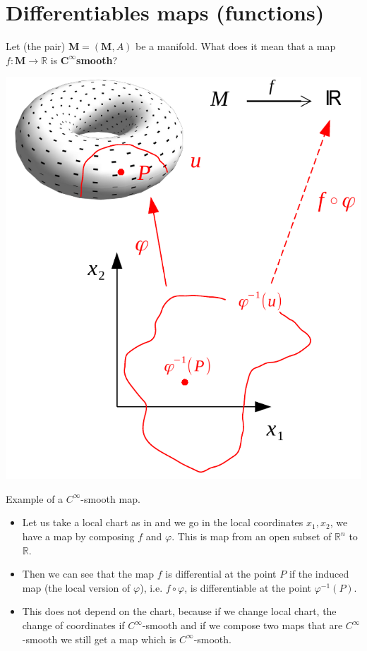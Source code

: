 \documentclass[../main.tex]{subfiles}
\begin{document}
\section[Differentiables maps]{Differentiables maps (functions)}
Let (the pair) $\mathbf{M}=\left(\mathbf{M}, A\right)$ be a manifold. What does it mean that a map $f:\mathbf{M}\to\mathbb{R}$ is $\mathbf{C^\infty}$\textbf{smooth}?
\begin{marginfigure}
	\includegraphics{images/c_smooth.pdf}
	\caption[$C^\infty$-smooth map]{Example of a $C^\infty$-smooth map.}
\end{marginfigure}
\begin{itemize}
    \item Let us take a local chart as in  and we go in the local coordinates $x_1,x_2$, we have a map by composing $f$ and $\varphi$. This is map from an open subset of $\mathbb{R}^n$ to $\mathbb{R}$.
    \item Then we can see that the map $f$ is differential at the point $P$ if the induced map (the local version of  $\varphi$), i.e. $f\circ\varphi$, is differentiable  at the point $\varphi^{-1}(P)$.
    \item This does not depend on the chart, because if we change local chart, the change of coordinates if $C^\infty$-smooth and if we compose two maps that are $C^\infty$-smooth we still get a map which is $C^\infty$-smooth.
\end{itemize}
\end{document}
